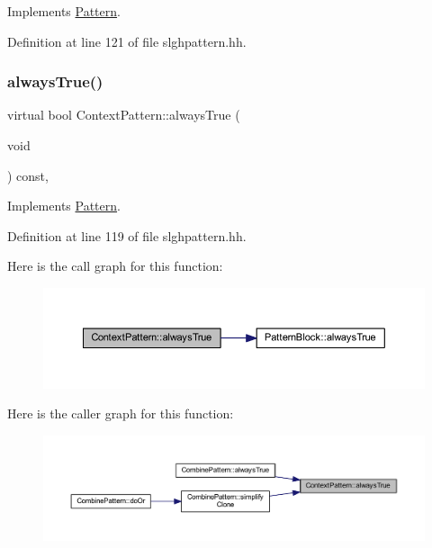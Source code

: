 Implements \mbox{\hyperlink{class_pattern_a62dd2f6b8bbb33279586739924ba4fa9}{Pattern}}.



Definition at line 121 of file slghpattern.\+hh.

\mbox{\label{class_context_pattern_aa3a3b46175e110b361f342ad411a2c80}} 
\subsubsection{\texorpdfstring{alwaysTrue()}{alwaysTrue()}}
{\footnotesize\ttfamily virtual bool Context\+Pattern\+::always\+True (\begin{DoxyParamCaption}\item[{void}]{ }\end{DoxyParamCaption}) const\hspace{0.3cm}{\ttfamily [inline]}, {\ttfamily [virtual]}}



Implements \mbox{\hyperlink{class_pattern_ab1527189c63b797a70c23047c033d35f}{Pattern}}.



Definition at line 119 of file slghpattern.\+hh.

Here is the call graph for this function\+:
\nopagebreak
\begin{figure}[H]
\begin{center}
\leavevmode
\includegraphics[width=350pt]{class_context_pattern_aa3a3b46175e110b361f342ad411a2c80_cgraph}
\end{center}
\end{figure}
Here is the caller graph for this function\+:
\nopagebreak
\begin{figure}[H]
\begin{center}
\leavevmode
\includegraphics[width=350pt]{class_context_pattern_aa3a3b46175e110b361f342ad411a2c80_icgraph}
\end{center}
\end{figure}
\mbox{\label{class_context_pattern_a6fb24df62ecafb88fb1a41e8b710ab62}} 

